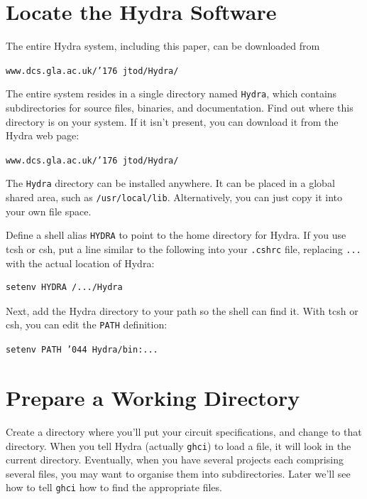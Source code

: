 \documentclass[a4paper,openany,fleqn]{book}
\begin{document}
\section{Locate the Hydra Software}
\label{sec:locate-hydra}

The entire Hydra system, including this paper,  can be downloaded from
\begin{center}
\texttt{www.dcs.gla.ac.uk/\char'176 jtod/Hydra/}
\end{center}

The entire system resides in a single directory named \texttt{Hydra},
which contains subdirectories for source files, binaries, and
documentation.  Find out where this directory is on your system.  If
it isn't present, you can download it from the Hydra web page:
\begin{center}
\texttt{www.dcs.gla.ac.uk/\char'176 jtod/Hydra/}
\end{center}
The \texttt{Hydra} directory can be installed anywhere.  It can be
placed in a global shared area, such as \texttt{/usr/local/lib}.
Alternatively, you can just copy it into your own file space.

Define a shell alias \texttt{HYDRA} to point to the home directory for
Hydra.  If you use tcsh or csh, put a line similar to the following
into your \texttt{.cshrc} file, replacing \texttt{...} with the actual
location of Hydra:
\begin{verbatim}
setenv HYDRA /.../Hydra
\end{verbatim}

Next, add the Hydra directory to your path so the shell can find it.
With tcsh or csh, you can edit the \texttt{PATH} definition:

\vspace{10pt}\noindent
\texttt{setenv PATH \char'044 Hydra/bin:...}


\section{Prepare a Working Directory}
\label{sec:prep-work-direct}

Create a directory where you'll put your circuit specifications, and
change to that directory.  When you tell Hydra (actually
\texttt{ghci}) to load a file, it will look in the current directory.
Eventually, when you have several projects each comprising several
files, you may want to organise them into subdirectories.  Later we'll
see how to tell \texttt{ghci} how to find the appropriate files.
\end{document}
